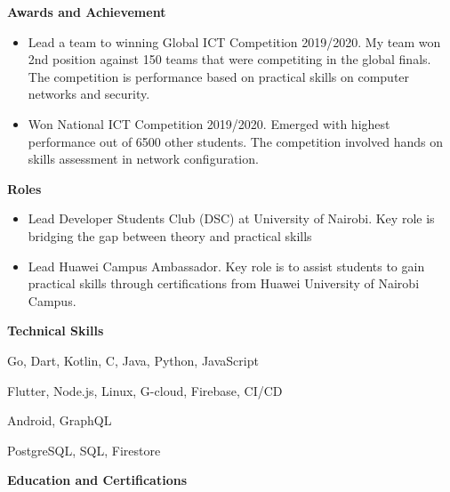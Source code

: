 \documentclass[a4paper]{article}
\begin{document}
\begin{center}
    {\Large \textbf{Awards and Achievement}}
\end{center}

\begin{itemize}[noitemsep]
    \item Lead a team to winning Global ICT Competition 2019/2020. My team won 2nd position against 150 teams that were competiting in the global finals. The competition is performance based on practical skills on computer networks and security.
    \item Won National ICT Competition 2019/2020. Emerged with highest performance out of 6500 other students. The competition involved hands on skills assessment in network configuration.
\end{itemize}

\begin{center}
    {\Large \textbf{Roles}}
\end{center}

\begin{itemize}[noitemsep]
    \item Lead Developer Students Club (DSC) at University of Nairobi. Key role is bridging the gap between theory and practical skills
    \item Lead Huawei Campus Ambassador. Key role is to assist students to gain practical skills through certifications from Huawei University of Nairobi Campus.
\end{itemize}

\begin{center}
    {\Large \textbf{Technical Skills}}
\end{center}

\begin{description}[noitemsep]
    \item[Languages:] Go, Dart, Kotlin, C, Java, Python, JavaScript
    \item[Platforms and tools:] Flutter, Node.js, Linux, G-cloud, Firebase, CI/CD
    \item[Frameworks:] Android, GraphQL
    \item[Databases:] PostgreSQL, SQL, Firestore
\end{description}

\begin{center}
    {\Large \textbf{Education and Certifications}}
\end{center}
\end{document}
